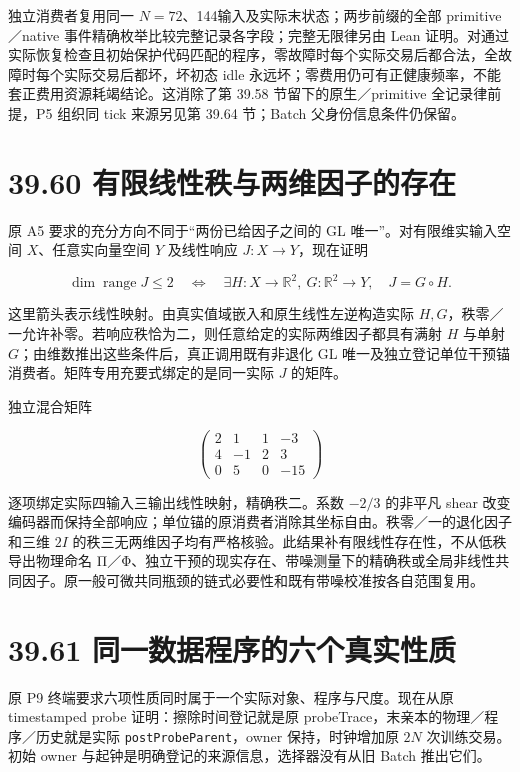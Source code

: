 \documentclass[
  11pt,
  oneside]{book}
\begin{document}
独立消费者复用同一 \(N=72\)、144输入及实际末状态；两步前缀的全部 primitive／native 事件精确枚举比较完整记录各字段；完整无限律另由 Lean 证明。对通过实际恢复检查且初始保护代码匹配的程序，零故障时每个实际交易后都合法，全故障时每个实际交易后都坏，坏初态 idle 永远坏；零费用仍可有正健康频率，不能套正费用资源耗竭结论。这消除了第 39.58 节留下的原生／primitive 全记录律前提，P5 组织同 tick 来源另见第 39.64 节；Batch 父身份信息条件仍保留。

\section{39.60 有限线性秩与两维因子的存在}\label{ux6709ux9650ux7ebfux6027ux79e9ux4e0eux4e24ux7ef4ux56e0ux5b50ux7684ux5b58ux5728}

原 A5 要求的充分方向不同于``两份已给因子之间的 GL 唯一''。对有限维实输入空间 \(X\)、任意实向量空间 \(Y\) 及线性响应 \(J:X\to Y\)，现在证明

\[\dim\operatorname{range}J\le2
\quad\Longleftrightarrow\quad
\exists H:X\to\mathbb R^2,\ G:\mathbb R^2\to Y,
\quad J=G\circ H.\]

这里箭头表示线性映射。由真实值域嵌入和原生线性左逆构造实际 \(H,G\)，秩零／一允许补零。若响应秩恰为二，则任意给定的实际两维因子都具有满射 \(H\) 与单射 \(G\)；由维数推出这些条件后，真正调用既有非退化 GL 唯一及独立登记单位干预锚消费者。矩阵专用充要式绑定的是同一实际 \(J\) 的矩阵。

独立混合矩阵

\[\begin{pmatrix}
2&1&1&-3\\
4&-1&2&3\\
0&5&0&-15
\end{pmatrix}\]

逐项绑定实际四输入三输出线性映射，精确秩二。系数 \(-2/3\) 的非平凡 shear 改变编码器而保持全部响应；单位锚的原消费者消除其坐标自由。秩零／一的退化因子和三维 \(2I\) 的秩三无两维因子均有严格核验。此结果补有限线性存在性，不从低秩导出物理命名 Π／Φ、独立干预的现实存在、带噪测量下的精确秩或全局非线性共同因子。原一般可微共同瓶颈的链式必要性和既有带噪校准按各自范围复用。

\section{39.61 同一数据程序的六个真实性质}\label{ux540cux4e00ux6570ux636eux7a0bux5e8fux7684ux516dux4e2aux771fux5b9eux6027ux8d28}

原 P9 终端要求六项性质同时属于一个实际对象、程序与尺度。现在从原 timestamped probe 证明：擦除时间登记就是原 probeTrace，末亲本的物理／程序／历史就是实际 \nolinkurl{postProbeParent}，owner 保持，时钟增加原 \(2N\) 次训练交易。初始 owner 与起钟是明确登记的来源信息，选择器没有从旧 Batch 推出它们。
\end{document}
